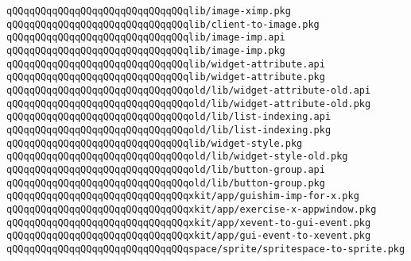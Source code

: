 \verb|qQQqqQQqqQQqqQQqqQQqqQQqqQQqqQQqlib/image-ximp.pkg|\newline
\verb|qQQqqQQqqQQqqQQqqQQqqQQqqQQqqQQqlib/client-to-image.pkg|\newline
\newline
\verb|qQQqqQQqqQQqqQQqqQQqqQQqqQQqqQQqlib/image-imp.api|\newline
\verb|qQQqqQQqqQQqqQQqqQQqqQQqqQQqqQQqlib/image-imp.pkg|\newline
\newline
\verb|qQQqqQQqqQQqqQQqqQQqqQQqqQQqqQQqlib/widget-attribute.api|\newline
\verb|qQQqqQQqqQQqqQQqqQQqqQQqqQQqqQQqlib/widget-attribute.pkg|\newline
\newline
\verb|qQQqqQQqqQQqqQQqqQQqqQQqqQQqqQQqold/lib/widget-attribute-old.api|\newline
\verb|qQQqqQQqqQQqqQQqqQQqqQQqqQQqqQQqold/lib/widget-attribute-old.pkg|\newline
\newline
\verb|qQQqqQQqqQQqqQQqqQQqqQQqqQQqqQQqold/lib/list-indexing.api|\newline
\verb|qQQqqQQqqQQqqQQqqQQqqQQqqQQqqQQqold/lib/list-indexing.pkg|\newline
\newline
\verb|qQQqqQQqqQQqqQQqqQQqqQQqqQQqqQQqlib/widget-style.pkg|\newline
\verb|qQQqqQQqqQQqqQQqqQQqqQQqqQQqqQQqold/lib/widget-style-old.pkg|\newline
\newline
\verb|qQQqqQQqqQQqqQQqqQQqqQQqqQQqqQQqold/lib/button-group.api|\newline
\verb|qQQqqQQqqQQqqQQqqQQqqQQqqQQqqQQqold/lib/button-group.pkg|\newline
\newline
\verb|qQQqqQQqqQQqqQQqqQQqqQQqqQQqqQQqxkit/app/guishim-imp-for-x.pkg|\newline
\verb|qQQqqQQqqQQqqQQqqQQqqQQqqQQqqQQqxkit/app/exercise-x-appwindow.pkg|\newline
\verb|qQQqqQQqqQQqqQQqqQQqqQQqqQQqqQQqxkit/app/xevent-to-gui-event.pkg|\newline
\verb|qQQqqQQqqQQqqQQqqQQqqQQqqQQqqQQqxkit/app/gui-event-to-xevent.pkg|\newline
\newline
\verb|qQQqqQQqqQQqqQQqqQQqqQQqqQQqqQQqspace/sprite/spritespace-to-sprite.pkg|\newline
\newline
